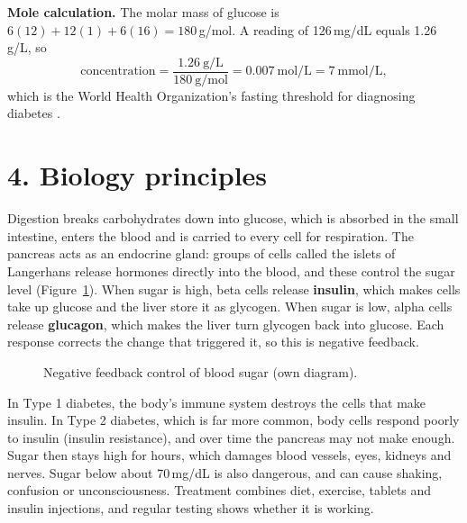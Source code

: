 \documentclass[11pt,a4paper]{article}
\begin{document}
\textbf{Mole calculation.} The molar mass of glucose is $6(12)+12(1)+6(16)=180$\,g/mol. A reading of 126\,mg/dL equals 1.26\,g/L, so
\[
\text{concentration} = \frac{1.26\ \text{g/L}}{180\ \text{g/mol}} = 0.007\ \text{mol/L} = 7\ \text{mmol/L},
\]
which is the World Health Organization's fasting threshold for diagnosing diabetes \cite{who}.

\section*{4. Biology principles}

Digestion breaks carbohydrates down into glucose, which is absorbed in the small intestine, enters the blood and is carried to every cell for respiration. The pancreas acts as an endocrine gland: groups of cells called the islets of Langerhans release hormones directly into the blood, and these control the sugar level (Figure~\ref{fig:loop}). When sugar is high, beta cells release \textbf{insulin}, which makes cells take up glucose and the liver store it as glycogen. When sugar is low, alpha cells release \textbf{glucagon}, which makes the liver turn glycogen back into glucose. Each response corrects the change that triggered it, so this is negative feedback.

\begin{figure}[ht]
\centering
{}
\caption{Negative feedback control of blood sugar (own diagram).}
\label{fig:loop}
\end{figure}

In Type 1 diabetes, the body's immune system destroys the cells that make insulin. In Type 2 diabetes, which is far more common, body cells respond poorly to insulin (insulin resistance), and over time the pancreas may not make enough. Sugar then stays high for hours, which damages blood vessels, eyes, kidneys and nerves. Sugar below about 70\,mg/dL is also dangerous, and can cause shaking, confusion or unconsciousness. Treatment combines diet, exercise, tablets and insulin injections, and regular testing shows whether it is working.
\end{document}
